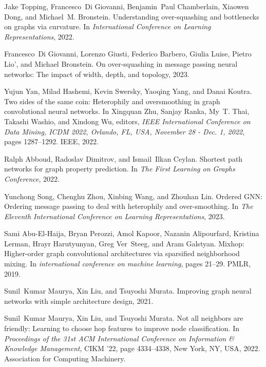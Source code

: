 \documentclass{article}
\theoremstyle{plain}
\theoremstyle{definition}
\begin{document}
{\begin{thebibliography}{10}
Jake Topping, Francesco~Di Giovanni, Benjamin~Paul Chamberlain, Xiaowen Dong,
  and Michael~M. Bronstein.
\newblock Understanding over-squashing and bottlenecks on graphs via curvature.
\newblock In {\em International Conference on Learning Representations}, 2022.

Francesco~Di Giovanni, Lorenzo Giusti, Federico Barbero, Giulia Luise, Pietro
  Lio', and Michael Bronstein.
\newblock On over-squashing in message passing neural networks: The impact of
  width, depth, and topology, 2023.

Yujun Yan, Milad Hashemi, Kevin Swersky, Yaoqing Yang, and Danai Koutra.
\newblock Two sides of the same coin: Heterophily and oversmoothing in graph
  convolutional neural networks.
\newblock In Xingquan Zhu, Sanjay Ranka, My~T. Thai, Takashi Washio, and
  Xindong Wu, editors, {\em {IEEE} International Conference on Data Mining,
  {ICDM} 2022, Orlando, FL, USA, November 28 - Dec. 1, 2022}, pages 1287--1292.
  {IEEE}, 2022.

Ralph Abboud, Radoslav Dimitrov, and Ismail~Ilkan Ceylan.
\newblock Shortest path networks for graph property prediction.
\newblock In {\em The First Learning on Graphs Conference}, 2022.

Yunchong Song, Chenghu Zhou, Xinbing Wang, and Zhouhan Lin.
\newblock Ordered {GNN}: Ordering message passing to deal with heterophily and
  over-smoothing.
\newblock In {\em The Eleventh International Conference on Learning
  Representations}, 2023.

Sami Abu-El-Haija, Bryan Perozzi, Amol Kapoor, Nazanin Alipourfard, Kristina
  Lerman, Hrayr Harutyunyan, Greg Ver~Steeg, and Aram Galstyan.
\newblock Mixhop: Higher-order graph convolutional architectures via sparsified
  neighborhood mixing.
\newblock In {\em international conference on machine learning}, pages 21--29.
  PMLR, 2019.

Sunil~Kumar Maurya, Xin Liu, and Tsuyoshi Murata.
\newblock Improving graph neural networks with simple architecture design,
  2021.

Sunil~Kumar Maurya, Xin Liu, and Tsuyoshi Murata.
\newblock Not all neighbors are friendly: Learning to choose hop features to
  improve node classification.
\newblock In {\em Proceedings of the 31st ACM International Conference on
  Information \& Knowledge Management}, CIKM '22, page 4334–4338, New York,
  NY, USA, 2022. Association for Computing Machinery.


\end{thebibliography}}
\end{document}
